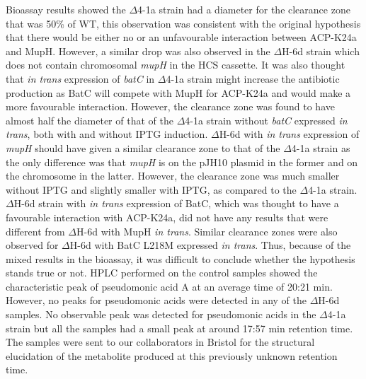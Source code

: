Bioassay results showed the $ \Delta $4-1a strain had a diameter for the clearance zone that was 50\% of WT, this observation was consistent with the original hypothesis that there would be either no or an unfavourable interaction between ACP-K24a and MupH. However, a similar drop was also observed in the  $ \Delta $H-6d strain which does not contain chromosomal \textit{mupH} in the HCS cassette. It was also thought that \textit{in trans }expression of \textit{batC} in $ \Delta $4-1a strain might increase the antibiotic production as BatC will compete with MupH for ACP-K24a and would make a more favourable interaction. However, the clearance zone was found to have almost half the diameter of that of the $ \Delta $4-1a strain without \textit{batC} expressed \textit{in trans}, both with and without IPTG induction. $ \Delta $H-6d with \textit{in trans} expression of \textit{mupH} should have given a similar clearance zone to that of the $ \Delta $4-1a strain as the only difference was that \textit{mupH} is on the pJH10 plasmid in the former and on the chromosome in the latter. However, the clearance zone was much smaller without IPTG and slightly smaller with IPTG, as compared to the $ \Delta $4-1a strain. $ \Delta $H-6d strain with \textit{in trans} expression of BatC, which was thought to have a favourable interaction with ACP-K24a, did not have any results that were different from  $ \Delta $H-6d with MupH \textit{in trans}. Similar clearance zones were also observed for $ \Delta $H-6d with BatC L218M expressed \textit{in trans}. Thus, because of the mixed results in the bioassay, it was difficult to conclude whether the hypothesis stands true or not. HPLC performed on the control samples showed the characteristic peak of pseudomonic acid A at an average time of 20:21 min. However, no peaks for pseudomonic acids were detected in any of the $ \Delta $H-6d samples. No observable peak was detected for pseudomonic acids in the $ \Delta $4-1a strain but all the samples had a small peak at around 17:57 min retention time. The samples were sent to our collaborators in Bristol for the structural elucidation of the metabolite produced at this previously unknown retention time.

